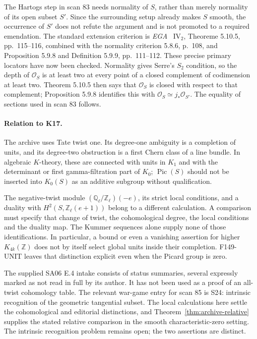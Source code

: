 The Hartogs step in scan 83 needs normality of \(S\), rather than
merely normality of its open subset \(S'\).  Since the surrounding
setup already makes \(S\) smooth, the occurrence of \(S'\) does not
refute the argument and is not promoted to a required emendation.
The standard extension criterion is \emph{EGA}~\cite{EGAIV2}
\(\mathrm{IV}_2\), Theoreme 5.10.5, pp.~115--116, combined with
the normality criterion 5.8.6, p.~108, and Proposition 5.9.8 and
Definition 5.9.9, pp.~111--112.  These precise primary locators have
now been checked.  Normality gives Serre's \(S_2\) condition, so
the depth of \(\mathcal O_S\) is at least two at every point of a
closed complement of codimension at least two.  Theorem 5.10.5
then says that \(\mathcal O_S\) is closed with respect to that
complement; Proposition 5.9.8 identifies this with
\(\mathcal O_S\simeq j_*\mathcal O_{S'}\).
The equality of sections used in scan 83 follows.

\paragraph{Relation to K17.}
The archive uses Tate twist one.  Its degree-one ambiguity is a
completion of units, and its degree-two obstruction is a first Chern
class of a line bundle.  In algebraic \(K\)-theory, these are connected
with units in \(K_1\) and with the determinant or first
gamma-filtration part of \(K_0\); \(\operatorname{Pic}(S)\) should
not be inserted into \(K_0(S)\) as an additive subgroup without
qualification.

The negative-twist module
\((\mathbb Q_\ell/\mathbb Z_\ell)(-e)\), its strict local conditions,
and a duality with \(H^2(S,\mathbb Z_\ell(e+1))\) belong to a
different calculation.  A comparison must specify that change of
twist, the cohomological degree, the local conditions and the duality
map.  The Kummer sequences alone supply none of those identifications.
In particular, a bound or even a vanishing assertion for higher
\(K_{4k}(\mathbb Z)\) does not by itself select global units inside
their completion.  F149-UNIT leaves that distinction explicit even
when the Picard group is zero.

The supplied SA06 E.4 intake consists of status summaries, several
expressly marked as not read in full by its author.  It has not been
used as a proof of an all-twist cohomology table.  The relevant
war-game entry for scan 85 is S24: intrinsic recognition of the
geometric tangential subset.  The local calculations here settle the
cohomological and editorial distinctions, and Theorem~\ref{thm:archive-relative} supplies the stated relative comparison in the smooth characteristic-zero setting. The intrinsic recognition problem remains open; the two assertions are distinct.
